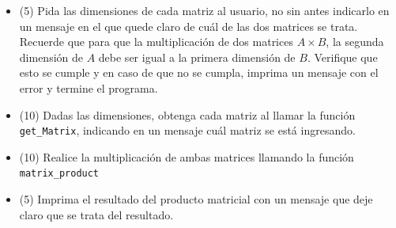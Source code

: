 \documentclass[11pt,letterpaper]{exam}
\begin{document}
\begin{questions}
\begin{itemize}
\item (5) Pida las dimensiones de cada matriz al usuario, no sin antes indicarlo en un mensaje en el que quede claro de cu\'al de las dos matrices se trata. Recuerde que para que la multiplicaci\'on de dos matrices $A\times B$, la segunda dimensi\'on de $A$ debe ser igual a la primera dimensi\'on de $B$. Verifique que esto se cumple y en caso de que no se cumpla, imprima un mensaje con el error y termine el programa.
\item (10) Dadas las dimensiones, obtenga cada matriz al llamar la funci\'on \verb"get_Matrix", indicando en un mensaje cu\'al matriz se est\'a ingresando.
\item (10) Realice la multiplicaci\'on de ambas matrices llamando la funci\'on \verb"matrix_product"
\item (5) Imprima el resultado del producto matricial con un mensaje que deje claro que se trata del resultado.  
\end{itemize}

\end{questions}
\end{document}
